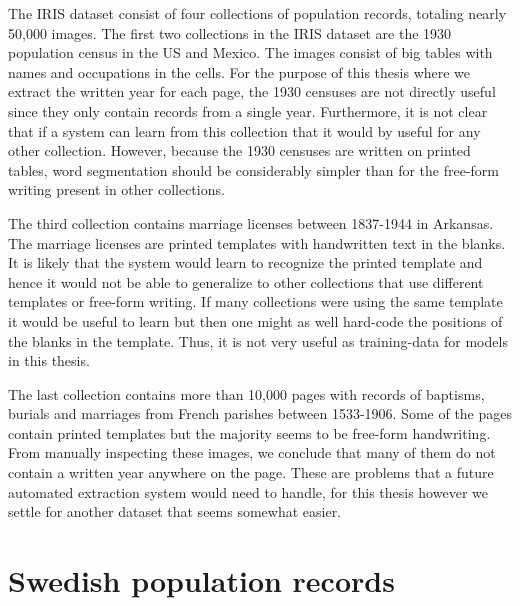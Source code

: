 The IRIS dataset consist of four collections of population records, totaling nearly 50,000 images.
The first two collections in the IRIS dataset are the 1930 population census in the US and Mexico. The images consist of big tables with names and occupations in the cells.
For the purpose of this thesis where we extract the written year for each page, the 1930 censuses are not directly useful since they only contain records from a single year. Furthermore, it is not clear that if a system can learn from this collection that it would by useful for any other collection.
However, because the 1930 censuses are written on printed tables, word segmentation should be considerably simpler than for the free-form writing present in other collections.

The third collection contains marriage licenses between 1837-1944 in Arkansas. The marriage licenses are printed templates with handwritten text in the blanks.
It is likely that the system would learn to recognize the printed template and hence it would not be able to generalize to other collections that use different templates or free-form writing. If many collections were using the same template it would be useful to learn but then one might as well hard-code the positions of the blanks in the template. Thus, it is not very useful as training-data for models in this thesis.

The last collection contains more than 10,000 pages with records of baptisms, burials and marriages from French parishes between 1533-1906. Some of the pages contain printed templates but the majority seems to be free-form handwriting.
From manually inspecting these images, we conclude that many of them do not contain a written year anywhere on the page. These are problems that a future automated extraction system would need to handle, for this thesis however we settle for another dataset that seems somewhat easier.

\newpage
\section{Swedish population records}

